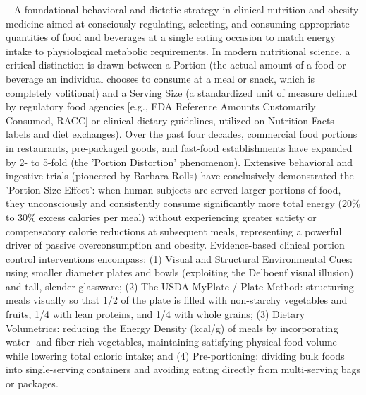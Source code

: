 -- A foundational behavioral and dietetic strategy in clinical nutrition and obesity medicine aimed at consciously regulating, selecting, and consuming appropriate quantities of food and beverages at a single eating occasion to match energy intake to physiological metabolic requirements. In modern nutritional science, a critical distinction is drawn between a Portion (the actual amount of a food or beverage an individual chooses to consume at a meal or snack, which is completely volitional) and a Serving Size (a standardized unit of measure defined by regulatory food agencies [e.g., FDA Reference Amounts Customarily Consumed, RACC] or clinical dietary guidelines, utilized on Nutrition Facts labels and diet exchanges). Over the past four decades, commercial food portions in restaurants, pre-packaged goods, and fast-food establishments have expanded by 2- to 5-fold (the 'Portion Distortion' phenomenon). Extensive behavioral and ingestive trials (pioneered by Barbara Rolls) have conclusively demonstrated the 'Portion Size Effect': when human subjects are served larger portions of food, they unconsciously and consistently consume significantly more total energy (20\% to 30\% excess calories per meal) without experiencing greater satiety or compensatory calorie reductions at subsequent meals, representing a powerful driver of passive overconsumption and obesity. Evidence-based clinical portion control interventions encompass: (1) Visual and Structural Environmental Cues: using smaller diameter plates and bowls (exploiting the Delboeuf visual illusion) and tall, slender glassware; (2) The USDA MyPlate / Plate Method: structuring meals visually so that 1/2 of the plate is filled with non-starchy vegetables and fruits, 1/4 with lean proteins, and 1/4 with whole grains; (3) Dietary Volumetrics: reducing the Energy Density (kcal/g) of meals by incorporating water- and fiber-rich vegetables, maintaining satisfying physical food volume while lowering total caloric intake; and (4) Pre-portioning: dividing bulk foods into single-serving containers and avoiding eating directly from multi-serving bags or packages.

